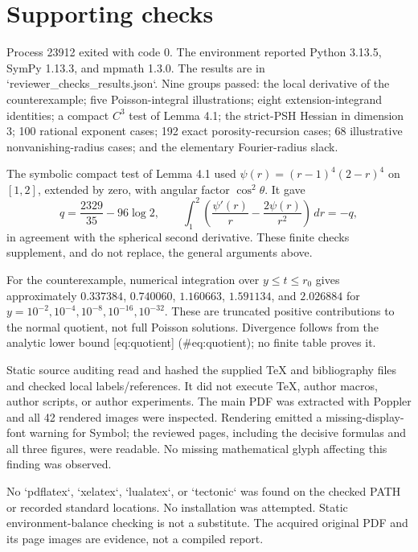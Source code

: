 \documentclass[10pt]{article}
\begin{document}
\section*{Supporting checks}
Process 23912 exited with code 0. The environment reported Python 3.13.5, SymPy 1.13.3, and mpmath 1.3.0. The results are in `reviewer\_checks\_results.json`. Nine groups passed: the local derivative of the counterexample; five Poisson-integral illustrations; eight extension-integrand identities; a compact \(C^3\) test of Lemma 4.1; the strict-PSH Hessian in dimension 3; 100 rational exponent cases; 192 exact porosity-recursion cases; 68 illustrative nonvanishing-radius cases; and the elementary Fourier-radius slack.\par
The symbolic compact test of Lemma 4.1 used \(\psi(r)=(r-1)^4(2-r)^4\) on \([1,2]\), extended by zero, with angular factor \(\cos^2\theta\). It gave \[q=\frac{2329}{35}-96\log2,\qquad
 \int_1^2\left(\frac{\psi'(r)}r-\frac{2\psi(r)}{r^2}\right)\,dr=-q,\] in agreement with the spherical second derivative. These finite checks supplement, and do not replace, the general arguments above.\par
For the counterexample, numerical integration over \(y\leq t\leq r_0\) gives approximately \(0.337384\), \(0.740060\), \(1.160663\), \(1.591134\), and \(2.026884\) for \(y=10^{-2},10^{-4},10^{-8},10^{-16},10^{-32}\). These are truncated positive contributions to the normal quotient, not full Poisson solutions. Divergence follows from the analytic lower bound [eq:quotient] (\#eq:quotient); no finite table proves it.\par
Static source auditing read and hashed the supplied TeX and bibliography files and checked local labels/references. It did not execute TeX, author macros, author scripts, or author experiments. The main PDF was extracted with Poppler and all 42 rendered images were inspected. Rendering emitted a missing-display-font warning for Symbol; the reviewed pages, including the decisive formulas and all three figures, were readable. No missing mathematical glyph affecting this finding was observed.\par
No `pdflatex`, `xelatex`, `lualatex`, or `tectonic` was found on the checked PATH or recorded standard locations. No installation was attempted. Static environment-balance checking is not a substitute. The acquired original PDF and its page images are evidence, not a compiled report.\par
\end{document}
